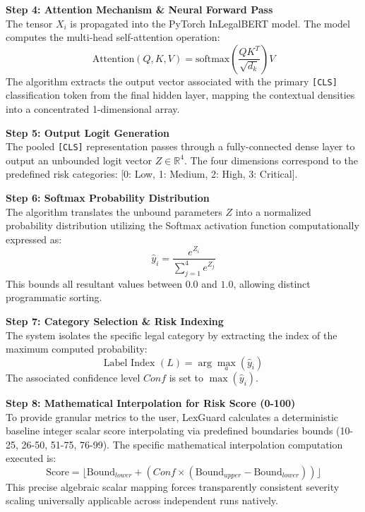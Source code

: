 \documentclass[a4paper,12pt]{report}
\begin{document}
\noindent\textbf{Step 4: Attention Mechanism \& Neural Forward Pass}\\
The tensor $X_i$ is propagated into the PyTorch InLegalBERT model. The model computes the multi-head self-attention operation:
\begin{equation}
\text{Attention}(Q, K, V) = \text{softmax}\left(\frac{QK^T}{\sqrt{d_k}}\right)V
\end{equation}
The algorithm extracts the output vector associated with the primary \texttt{[CLS]} classification token from the final hidden layer, mapping the contextual densities into a concentrated 1-dimensional array.

\noindent\textbf{Step 5: Output Logit Generation}\\
The pooled \texttt{[CLS]} representation passes through a fully-connected dense layer to output an unbounded logit vector $Z \in \mathbb{R}^4$. The four dimensions correspond to the predefined risk categories: [0: Low, 1: Medium, 2: High, 3: Critical].

\noindent\textbf{Step 6: Softmax Probability Distribution}\\
The algorithm translates the unbound parameters $Z$ into a normalized probability distribution utilizing the Softmax activation function computationally expressed as:
\begin{equation}
\hat{y}_i = \frac{e^{Z_i}}{\sum_{j=1}^{4} e^{Z_j}}
\end{equation}
This bounds all resultant values between $0.0$ and $1.0$, allowing distinct programmatic sorting.

\noindent\textbf{Step 7: Category Selection \& Risk Indexing}\\
The system isolates the specific legal category by extracting the index of the maximum computed probability:
\begin{equation}
\text{Label Index } (L) = \arg\max_{a} (\hat{y}_i)
\end{equation}
The associated confidence level $Conf$ is set to $\max(\hat{y}_i)$.

\noindent\textbf{Step 8: Mathematical Interpolation for Risk Score (0-100)}\\
To provide granular metrics to the user, LexGuard calculates a deterministic baseline integer scalar score interpolating via predefined boundaries bounds (10-25, 26-50, 51-75, 76-99). The specific mathematical interpolation computation executed is:
\begin{equation}
\text{Score} = \lfloor \text{Bound}_{lower} + (Conf \times (\text{Bound}_{upper} - \text{Bound}_{lower})) \rfloor
\end{equation}
This precise algebraic scalar mapping forces transparently consistent severity scaling universally applicable across independent runs natively.
\end{document}
